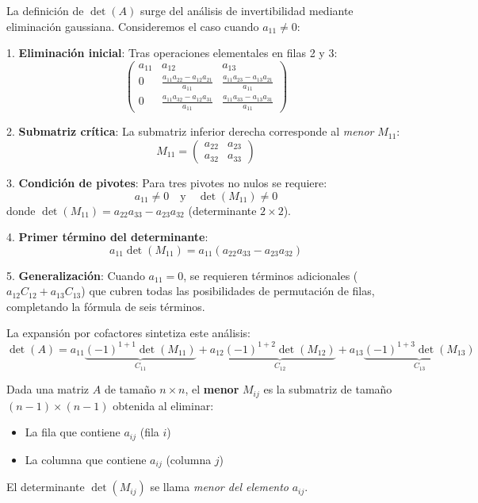 \begin{rem}
\label{rem:induccion-det}
La definición de $\det(A)$ surge del análisis de invertibilidad mediante eliminación gaussiana. Consideremos el caso cuando $a_{11} \neq 0$:

1. \textbf{Eliminación inicial}: Tras operaciones elementales en filas 2 y 3:
\[
\begin{pmatrix}
a_{11} & a_{12} & a_{13} \\
0 & \frac{a_{11}a_{22}-a_{12}a_{21}}{a_{11}} & \frac{a_{11}a_{23}-a_{13}a_{21}}{a_{11}} \\
0 & \frac{a_{11}a_{32}-a_{12}a_{31}}{a_{11}} & \frac{a_{11}a_{33}-a_{13}a_{31}}{a_{11}}
\end{pmatrix}
\]

2. \textbf{Submatriz crítica}: La submatriz inferior derecha corresponde al \textit{menor} $M_{11}$:
\[
M_{11} = \begin{pmatrix}
a_{22} & a_{23} \\
a_{32} & a_{33}
\end{pmatrix}
\]

3. \textbf{Condición de pivotes}: Para tres pivotes no nulos se requiere:
\[
a_{11} \neq 0 \quad \text{y} \quad \det(M_{11}) \neq 0
\]
donde $\det(M_{11}) = a_{22}a_{33} - a_{23}a_{32}$ (determinante $2\times 2$).

4. \textbf{Primer término del determinante}:
\[
a_{11}\det(M_{11}) = a_{11}(a_{22}a_{33} - a_{23}a_{32})
\]

5. \textbf{Generalización}: Cuando $a_{11} = 0$, se requieren términos adicionales ($a_{12}C_{12} + a_{13}C_{13}$) que cubren todas las posibilidades de permutación de filas, completando la fórmula de seis términos.

La expansión por cofactores sintetiza este análisis:
\[
\det(A) = a_{11}\underbrace{(-1)^{1+1}\det(M_{11})}_{C_{11}} + a_{12}\underbrace{(-1)^{1+2}\det(M_{12})}_{C_{12}} + a_{13}\underbrace{(-1)^{1+3}\det(M_{13})}_{C_{13}}
\]
\end{rem}

\begin{definition}
\label{def:menor}
Dada una matriz $A$ de tamaño $n \times n$, el \textbf{menor} $M_{ij}$ es la submatriz de tamaño $(n-1)\times(n-1)$ obtenida al eliminar:
\begin{itemize}
\item La fila que contiene $a_{ij}$ (fila $i$)
\item La columna que contiene $a_{ij}$ (columna $j$)
\end{itemize}
El determinante $\det(M_{ij})$ se llama \textit{menor del elemento} $a_{ij}$.
\end{definition}

